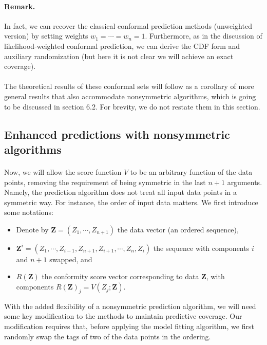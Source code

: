 \documentclass{article}
\numberwithin{equation}{section}
\begin{document}
\paragraph{Remark.} In fact, we can recover the classical conformal prediction methods (unweighted version) by setting weights $w_1=\cdots=w_{n}=1.$ Furthermore, as in the discussion of likelihood-weighted conformal prediction, we can derive the CDF form and auxiliary randomization (but here it is not clear we will achieve an exact coverage).

\paragraph{} The theoretical results of these conformal sets will
follow as a corollary of more general results that also accommodate nonsymmetric algorithms, which is going to be discussed in section 6.2. For brevity, we do not restate them in this section.

\subsection{Enhanced predictions with nonsymmetric algorithms}
\paragraph{} Now, we will allow the score function $V$ to be an arbitrary function of the data points, removing the requirement of being symmetric in the last $n+1$ arguments. Namely, the prediction algorithm does not treat all input data points in a symmetric way. For instance, the order of input data matters. We first introduce some notations:

\begin{itemize}
	\item Denote by $\mathbf{Z}=(Z_1,\cdots,Z_{n+1})$ the data vector (an ordered sequence),  
	\item $\mathbf{Z}^i=(Z_1,\cdots,Z_{i-1},Z_{n+1},Z_{i+1},\cdots,Z_n,Z_i)$ the sequence with components $i$ and $n+1$ swapped, and
	\item $R(\mathbf{Z})$ the conformity score vector corresponding to data $\mathbf{Z}$, with components $R(\mathbf{Z})_j=V(Z_j;\mathbf{Z})$.
\end{itemize}

With the added flexibility of a nonsymmetric prediction algorithm, we will need some key modification to the methods to maintain predictive coverage. Our modification requires that, before applying the model fitting algorithm, we first randomly swap the tags of two of the data points in the ordering.
\end{document}
